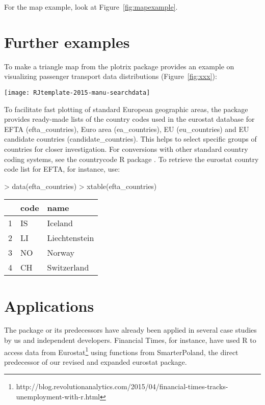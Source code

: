 For the map example, look at Figure~\ref{fig:mapexample}.


\section{Further examples}

To make a triangle map from the plotrix \citep{plotrix}
package provides an example on visualizing passenger transport data
distributions (Figure~\ref{fig:xxx}):

\texttt{[image: RJtemplate-2015-manu-searchdata]}

To facilitate fast plotting of standard European geographic areas, the package provides ready-made lists of the country codes used in the eurostat database for EFTA (efta\_countries), Euro area (ea\_countries), EU (eu\_countries) and EU candidate countries (candidate\_countries). This helps to select specific groups of countries for closer investigation. For conversions with other standard country coding systems, see the countrycode R package \citep{countrycode}. To retrieve the eurostat country code list for EFTA, for instance, use:

\begin{Schunk}
\begin{Sinput}
> data(efta_countries)
> xtable(efta_countries)
\end{Sinput}
\begin{Soutput}
% latex table generated in R 3.2.2 by xtable 1.8-0 package
% Mon Nov 23 12:22:09 2015
\begin{table}[ht]
\centering
\begin{tabular}{rll}
  \hline
 & code & name \\ 
  \hline
1 & IS & Iceland \\ 
  2 & LI & Liechtenstein \\ 
  3 & NO & Norway \\ 
  4 & CH & Switzerland \\ 
   \hline
\end{tabular}
\end{table}
\end{Soutput}
\end{Schunk}


\section{Applications}

The package or its predecessors have already been applied in several case studies by us and independent developers. Financial Times, for instance, have used R to access data from Eurostat\footnote{http://blog.revolutionanalytics.com/2015/04/financial-times-tracks-unemployment-with-r.html} using functions from SmarterPoland, the direct predecessor of our revised and expanded eurostat package.

